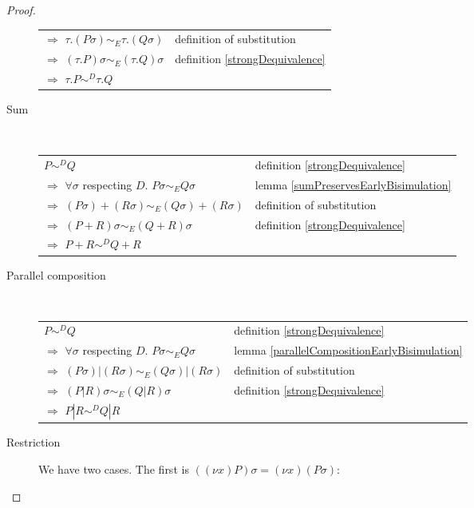 \begin{lemma}
\begin{proof}
\begin{description}
\begin{center}
\begin{tabular}{ll}
	  \\
	      $\Rightarrow$ $\tau.(P\sigma) \sim_{E} \tau.(Q\sigma)$
	    &
	      definition of substitution
	  \\
	      $\Rightarrow$ $(\tau.P)\sigma \sim_{E} (\tau.Q)\sigma$
	    &
	      definition \ref{strongDequivalence}
	  \\
	      $\Rightarrow$ $\tau.P \sim^{D} \tau.Q$
	    &
	  \end{tabular}
	\end{center}
      \item[Sum]\hfill \\
	\begin{center}
	  \begin{tabular}{ll}
	      $P \sim^{D} Q$
	    &
	      definition \ref{strongDequivalence}
	  \\
	      $\Rightarrow$ $\forall \sigma$ respecting $D.$ $P\sigma \sim_{E} Q\sigma$
	    &
	      lemma \ref{sumPreservesEarlyBisimulation}
	  \\
	      $\Rightarrow$ $(P\sigma)+(R\sigma) \sim_{E} (Q\sigma)+(R\sigma)$
	    &
	      definition of substitution
	  \\
	      $\Rightarrow$ $(P+R)\sigma \sim_{E} (Q+R)\sigma$
	    &
	      definition \ref{strongDequivalence}
	  \\
	      $\Rightarrow$ $P+R \sim^{D} Q+R$
	    &
	  \end{tabular}
	\end{center}
      \item[Parallel composition]\hfill \\
	\begin{center}
	  \begin{tabular}{ll}
	      $P \sim^{D} Q$
	    &
	      definition \ref{strongDequivalence}
	  \\
	      $\Rightarrow$ $\forall \sigma$ respecting $D.$ $P\sigma \sim_{E} Q\sigma$
	    &
	      lemma \ref{parallelCompositionEarlyBisimulation}
	  \\
	      $\Rightarrow$ $(P\sigma)|(R\sigma) \sim_{E} (Q\sigma)|(R\sigma)$
	    &
	      definition of substitution
	  \\
	      $\Rightarrow$ $(P|R)\sigma \sim_{E} (Q|R)\sigma$
	    &
	      definition \ref{strongDequivalence}
	  \\
	      $\Rightarrow$ $P|R \sim^{D} Q|R$
	    &
	  \end{tabular}
	\end{center}
      \item[Restriction]
	We have two cases. The first is $((\nu x) P)\sigma=(\nu x)(P\sigma)$:

\end{description}
\end{proof}
\end{lemma}
